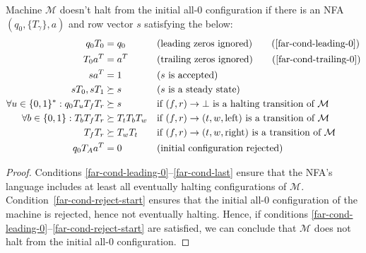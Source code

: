 \begin{theorem}
  \label{far-main-theorem}
  Machine $\mathcal{M}$ doesn't halt from the initial all-0 configuration if there is an NFA $(q_0, \{T_\gamma\}, a)$ and row vector $s$ satisfying the below:
  \begin{align}
    \label{far-cond-first}
    q_0 T_0                                & = q_0
                                           &                     & \text{(leading zeros ignored)}
    \tag{\ref{far-cond-leading-0}}
    \\
    T_0a\T                                 & = a\T
                                           &                     & \text{(trailing zeros ignored)}
    \tag{\ref{far-cond-trailing-0}}
    \\
    sa\T                                   & = 1
                                           &                     & \text{($s$ is accepted)}
    \label{far-cond-ass-accepted}
    \\
    sT_0,sT_1                              & \succeq s
                                           &                     & \text{($s$ is a steady state)}
    \label{far-cond-ass-steady}
    \\
    \forall u\in\{0, 1\}^*: q_0T_u T_f T_r & \succeq s
                                           &                     & \text{if $(f,r) \to \bot$ is a halting transition of $\mathcal{M}$}
    \label{far-cond-halt}
    \\
    \forall b\in\{0, 1\}: T_b T_f T_r      & \succeq T_t T_b T_w
                                           &                     & \text{if $(f,r) \to (t,w,\text{left})$ is a transition of $\mathcal{M}$}
    \label{far-cond-left}
    \\
    T_f T_r                                & \succeq T_w T_t
                                           &                     & \text{if $(f,r) \to (t,w,\text{right})$ is a transition of $\mathcal{M}$}
    \label{far-cond-last}
    \\
    q_0 T_A a\T                            & = 0
                                           &                     & \text{(initial configuration rejected)}
    \label{far-cond-reject-start}
  \end{align}
\end{theorem}
\begin{proof}
  Conditions \eqref{far-cond-leading-0}--\eqref{far-cond-last} ensure that the NFA's language includes at least all eventually halting configurations of $\mathcal{M}$. Condition~\eqref{far-cond-reject-start} ensures that the initial all-0 configuration of the machine is rejected, hence not eventually halting. Hence, if conditions \eqref{far-cond-leading-0}--\eqref{far-cond-reject-start} are satisfied, we can conclude that $\mathcal{M}$ does not halt from the initial all-0 configuration.
\end{proof}


